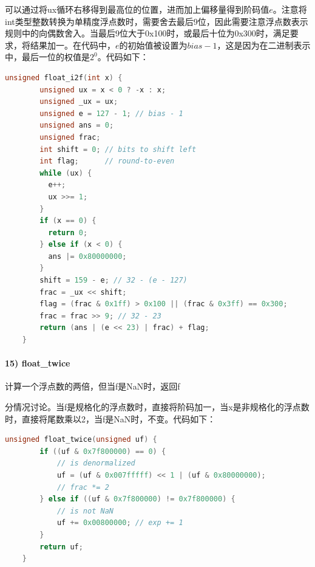 \documentclass{article}
\begin{document}
可以通过将ux循环右移得到最高位的位置，进而加上偏移量得到阶码值$e$。注意将int类型整数转换为单精度浮点数时，需要舍去最后9位，因此需要注意浮点数表示规则中的向偶数舍入。当最后9位大于0x100时，或最后十位为0x300时，满足要求，将结果加一。在代码中，$e$的初始值被设置为$bias-1$，这是因为在二进制表示中，最后一位的权值是$2^0$。代码如下：
\begin{lstlisting}[language=C]
    unsigned float_i2f(int x) {
        unsigned ux = x < 0 ? -x : x;
        unsigned _ux = ux;
        unsigned e = 127 - 1; // bias - 1
        unsigned ans = 0;
        unsigned frac;
        int shift = 0; // bits to shift left
        int flag;      // round-to-even
        while (ux) {
          e++;
          ux >>= 1;
        }
        if (x == 0) {
          return 0;
        } else if (x < 0) {
          ans |= 0x80000000;
        }
        shift = 159 - e; // 32 - (e - 127)
        frac = _ux << shift;
        flag = (frac & 0x1ff) > 0x100 || (frac & 0x3ff) == 0x300;
        frac = frac >> 9; // 32 - 23
        return (ans | (e << 23) | frac) + flag;
    }
\end{lstlisting}  
\paragraph{15) float\_twice} 计算一个浮点数的两倍，但当f是NaN时，返回f

分情况讨论。当f是规格化的浮点数时，直接将阶码加一，当x是非规格化的浮点数时，直接将尾数乘以2，当f是NaN时，不变。代码如下：
\begin{lstlisting}[language=C]
    unsigned float_twice(unsigned uf) {
        if ((uf & 0x7f800000) == 0) {                      
            // is denormalized
            uf = (uf & 0x007fffff) << 1 | (uf & 0x80000000); 
            // frac *= 2
        } else if ((uf & 0x7f800000) != 0x7f800000) {      
            // is not NaN
            uf += 0x00800000; // exp += 1
        }
        return uf;
    }
\end{lstlisting}  

\normalsize
\end{document}
